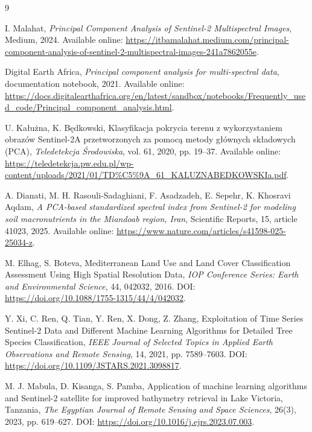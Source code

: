 \documentclass[12pt,a4paper]{article}
\begin{document}
\begin{thebibliography}{9}

I. Malahat, \textit{Principal Component Analysis of Sentinel-2 Multispectral Images}, Medium, 2024. Available online: \url{https://itbamalahat.medium.com/principal-component-analysis-of-sentinel-2-multispectral-images-241a7862055e}.

Digital Earth Africa, \textit{Principal component analysis for multi-spectral data}, documentation notebook, 2021. Available online: \url{https://docs.digitalearthafrica.org/en/latest/sandbox/notebooks/Frequently_used_code/Principal_component_analysis.html}.

U. Kałużna, K. Będkowski, Klasyfikacja pokrycia terenu z wykorzystaniem obrazów Sentinel-2A przetworzonych za pomocą metody głównych składowych (PCA), \textit{Teledetekcja Środowiska}, vol. 61, 2020, pp. 19--37. Available online: \url{https://teledetekcja.pw.edu.pl/wp-content/uploads/2021/01/TD%C5%9A_61_KALUZNABEDKOWSKIa.pdf}.

A. Dianati, M. H. Rasouli-Sadaghiani, F. Asadzadeh, E. Sepehr, K. Khosravi Aqdam, \textit{A PCA-based standardized spectral index from Sentinel-2 for modeling soil macronutrients in the Miandoab region, Iran}, Scientific Reports, 15, article 41023, 2025. Available online: \url{https://www.nature.com/articles/s41598-025-25034-z}.

M. Elhag, S. Boteva, Mediterranean Land Use and Land Cover Classification Assessment Using High Spatial Resolution Data, \textit{IOP Conference Series: Earth and Environmental Science}, 44, 042032, 2016. DOI: \url{https://doi.org/10.1088/1755-1315/44/4/042032}.

Y. Xi, C. Ren, Q. Tian, Y. Ren, X. Dong, Z. Zhang, Exploitation of Time Series Sentinel-2 Data and Different Machine Learning Algorithms for Detailed Tree Species Classification, \textit{IEEE Journal of Selected Topics in Applied Earth Observations and Remote Sensing}, 14, 2021, pp. 7589--7603. DOI: \url{https://doi.org/10.1109/JSTARS.2021.3098817}.

M. J. Mabula, D. Kisanga, S. Pamba, Application of machine learning algorithms and Sentinel-2 satellite for improved bathymetry retrieval in Lake Victoria, Tanzania, \textit{The Egyptian Journal of Remote Sensing and Space Sciences}, 26(3), 2023, pp. 619--627. DOI: \url{https://doi.org/10.1016/j.ejrs.2023.07.003}.



\end{thebibliography}
\end{document}
